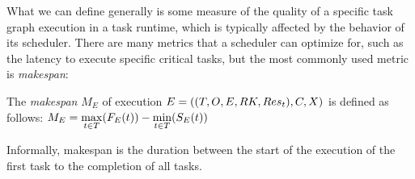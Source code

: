 What we can define generally is some measure of the quality of a specific task graph execution in a
task runtime, which is typically affected by the behavior of its scheduler. There are many metrics
that a scheduler can optimize for, such as the latency to execute specific critical tasks, but the
most commonly used metric is \emph{makespan}:

\vspace{2mm} The \emph{makespan} $M_E$ of execution $E = ((T, O, E, RK, Res_t), C, X)$
is defined as follows: $M_E = \max\limits_{t \in T}(F_E(t)) - \min\limits_{t \in T}(S_E(t))$

\vspace{1mm}Informally, makespan is the duration between the start of the execution of the first task to the
completion of all tasks.

